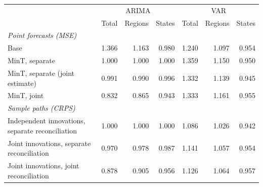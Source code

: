 \centering\small
\begin{tabular}{lrrrrrr}
\hline
 & \multicolumn{3}{c}{ARIMA} & \multicolumn{3}{c}{VAR} \\
 & Total & Regions & States & Total & Regions & States \\
\hline
\multicolumn{7}{l}{\emph{Point forecasts (MSE)}} \\
\quad Base & 1.366 & 1.163 & 0.980 & 1.240 & 1.097 & 0.954 \\
\quad MinT, separate & 1.000 & 1.000 & 1.000 & 1.359 & 1.150 & 0.950 \\
\quad MinT, separate (joint estimate) & 0.991 & 0.990 & 0.996 & 1.332 & 1.139 & 0.945 \\
\quad MinT, joint & 0.832 & 0.865 & 0.943 & 1.333 & 1.161 & 0.955 \\
\multicolumn{7}{l}{\emph{Sample paths (CRPS)}} \\
\quad Independent innovations, separate reconciliation & 1.000 & 1.000 & 1.000 & 1.086 & 1.026 & 0.942 \\
\quad Joint innovations, separate reconciliation & 0.970 & 0.978 & 0.987 & 1.141 & 1.057 & 0.954 \\
\quad Joint innovations, joint reconciliation & 0.878 & 0.905 & 0.956 & 1.126 & 1.064 & 0.957 \\
\hline
\end{tabular}
